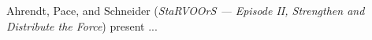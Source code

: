 

Ahrendt, Pace, and Schneider
\cite{isola-2016-ahrendt}
({\em StaRVOOrS — Episode II, Strengthen and Distribute the Force})
present ...
